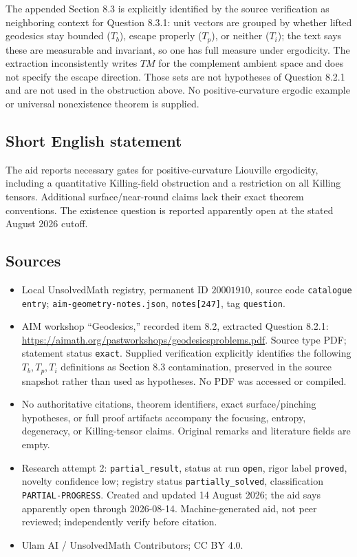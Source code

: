 \documentclass[11pt]{article}
\begin{document}
The appended Section 8.3 is explicitly identified by the source verification as neighboring context for Question 8.3.1: unit vectors are grouped by whether lifted geodesics stay bounded (\(T_b\)), escape properly (\(T_p\)), or neither (\(T_i\)); the text says these are measurable and invariant, so one has full measure under ergodicity. The extraction inconsistently writes \(TM\) for the complement ambient space and does not specify the escape direction. Those sets are not hypotheses of Question 8.2.1 and are not used in the obstruction above. No positive-curvature ergodic example or universal nonexistence theorem is supplied.
\subsection{Short English statement}
The aid reports necessary gates for positive-curvature Liouville ergodicity, including a quantitative Killing-field obstruction and a restriction on all Killing tensors. Additional surface/near-round claims lack their exact theorem conventions. The existence question is reported apparently open at the stated August 2026 cutoff.
\subsection{Sources}
\begin{itemize}
\item Local UnsolvedMath registry, permanent ID \(20001910\), source code \texttt{catalogue entry}; \texttt{aim-geometry-notes.json}, \texttt{notes[247]}, tag \texttt{question}.
\item AIM workshop ``Geodesics,'' recorded item 8.2, extracted Question 8.2.1: \url{https://aimath.org/pastworkshops/geodesicsproblems.pdf}. Source type PDF; statement status \texttt{exact}. Supplied verification explicitly identifies the following \(T_b,T_p,T_i\) definitions as Section 8.3 contamination, preserved in the source snapshot rather than used as hypotheses. No PDF was accessed or compiled.
\item No authoritative citations, theorem identifiers, exact surface/pinching hypotheses, or full proof artifacts accompany the focusing, entropy, degeneracy, or Killing-tensor claims. Original remarks and literature fields are empty.
\item Research attempt 2: \texttt{partial\_result}, status at run \texttt{open}, rigor label \texttt{proved}, novelty confidence low; registry status \texttt{partially\_solved}, classification \texttt{PARTIAL-PROGRESS}. Created and updated 14 August 2026; the aid says apparently open through 2026-08-14. Machine-generated aid, not peer reviewed; independently verify before citation.
\item Ulam AI / UnsolvedMath Contributors; CC BY 4.0.
\end{itemize}
\end{document}
